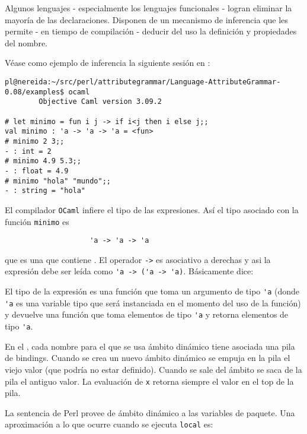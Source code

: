Algunos lenguajes - especialmente los lenguajes funcionales - logran eliminar la mayoría 
de las declaraciones. Disponen de un mecanismo de inferencia que les permite - en
tiempo de compilación - deducir
del uso la definición y propiedades del nombre. 

Véase como ejemplo de inferencia la siguiente sesión en :
\begin{verbatim}
pl@nereida:~/src/perl/attributegrammar/Language-AttributeGrammar-0.08/examples$ ocaml
        Objective Caml version 3.09.2

# let minimo = fun i j -> if i<j then i else j;;
val minimo : 'a -> 'a -> 'a = <fun>
# minimo 2 3;;
- : int = 2
# minimo 4.9 5.3;;
- : float = 4.9
# minimo "hola" "mundo";;
- : string = "hola"
\end{verbatim}

El compilador \verb|OCaml| infiere el tipo de las expresiones. 
Así el tipo asociado con la función \verb|minimo| es

\begin{verbatim}
                    'a -> 'a -> 'a
\end{verbatim}

que es una  que contiene
. El operador \verb|->| es asociativo a derechas
y asi la expresión debe ser leída como \verb|'a -> ('a -> 'a)|. 
Básicamente dice: 

El tipo de la expresión es una función que toma un argumento de tipo \verb|'a|
(donde \verb|'a| es una variable tipo que será instanciada en el momento del
uso de la función) y devuelve una función que toma elementos de tipo \verb|'a|
y retorna elementos de tipo \verb|'a|. 


En el , cada nombre para el que se usa ámbito dinámico
tiene asociada una pila de bindings. Cuando se crea un nuevo ámbito
dinámico se empuja en la pila el viejo valor (que podría no estar definido).
Cuando se sale del ámbito se saca de la pila el antiguo valor.
La evaluación de \verb|x| retorna siempre el valor en el top de la pila.


La sentencia  de Perl provee de ámbito dinámico
a las variables de paquete.
Una aproximaci\'{o}n a lo que ocurre cuando se ejecuta 
\verb|local| es:

